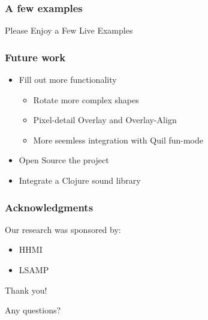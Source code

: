 \documentclass{beamer}
\begin{document}
\begin{frame}
	\frametitle{A few examples}
	 Please Enjoy a Few Live Examples
\end{frame}

\begin{frame}
	\frametitle{Future work}
	\begin{itemize}
		\item Fill out more functionality
		\begin{itemize}
			\item Rotate more complex shapes
			\item Pixel-detail Overlay and Overlay-Align
			\item More seemless integration with Quil fun-mode
		\end{itemize}
		\item Open Source the project
		\item Integrate a Clojure sound library
	\end{itemize}
\end{frame}

\begin{frame}
\frametitle{Acknowledgments}
	Our research was sponsored by:
	\begin{itemize}
	\item HHMI
	\item LSAMP
	\end{itemize}
	{\centering
	\noindent
	Thank you! \par
	Any questions? \par
	}
\end{frame}
\end{document}

